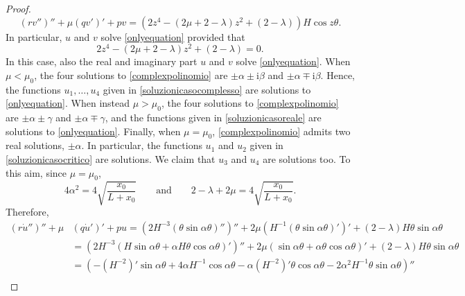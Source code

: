\documentclass[11pt]{amsart}
\theoremstyle{definition}
\theoremstyle{remark}
\numberwithin{equation}{section}
\begin{document}
\begin{proof}
\begin{equation*}
\left(r  v''\right)''+ \mu\left(q  v'\right)' + pv=\left(2z^4-(2\mu+2-\lambda)z^2+(2-\lambda)\right)H\cos z\theta.
\end{equation*}
In particular, $u$ and $v$ solve \eqref{onlyequation} provided that 
\begin{equation}\label{complexpolinomio}
2z^4-(2\mu+2-\lambda)z^2+(2-\lambda)=0.
\end{equation}
In this case, also the real and imaginary part $u$ and $v$ solve \eqref{onlyequation}. When $\mu<\mu_0$, the four solutions to \eqref{complexpolinomio} are $\pm\alpha\pm\mathrm i \beta$ and $\pm\alpha\mp \mathrm i \beta.$ Hence, the functions $u_1,\ldots,u_4$ given in \eqref{soluzionicasocomplesso} are solutions to \eqref{onlyequation}. When instead $\mu>\mu_0$, the four solutions to \eqref{complexpolinomio} are $\pm\alpha\pm\gamma$ and $\pm\alpha\mp\gamma$, and the functions given in \eqref{soluzionicasoreale} are solutions to \eqref{onlyequation}.
Finally, when $\mu=\mu_0$, \eqref{complexpolinomio} admits two real solutions, $\pm\alpha$. In particular, the functions $u_1$ and $u_2$ given in \eqref{soluzionicasocritico} are solutions. We claim that $u_3$ and $u_4$ are solutions too. To this aim, since $\mu=\mu_0$,
\begin{equation}\label{auxcomputcritic}
4\alpha^2=4\sqrt{\frac{x_0}{L+x_0}}\qquad\text{and}\qquad 2-\lambda+2\mu=4\sqrt{\frac{x_0}{L+x_0}}.
\end{equation}
Therefore,
\begin{equation*}      \begin{split}          \left(r \dot u''\right)''+ \mu&\left(q \dot u'\right)' + pu=\left(2H^{-3}(\theta\sin\alpha\theta)''\right)''+2\mu\left(H^{-1}(\theta\sin\alpha\theta)'\right)'+(2-\lambda)H\theta\sin\alpha\theta\\
	&=\left(2H^{-3}(H\sin\alpha\theta+\alpha H\theta\cos\alpha\theta)'\right)''+2\mu\left(\sin\alpha\theta+\alpha\theta\cos\alpha\theta\right)'+(2-\lambda)H\theta\sin\alpha\theta\\
	&=\left(-\left(H^{-2}\right)'\sin\alpha\theta+4\alpha H^{-1}\cos\alpha\theta-\alpha \left(H^{-2}\right)'\theta\cos\alpha\theta-2\alpha^2 H^{-1}\theta\sin\alpha\theta\right)''\\

\end{split}
\end{equation*}
\end{proof}
\end{document}
